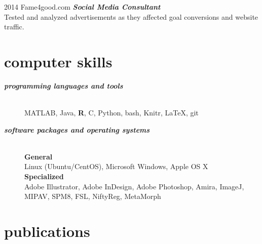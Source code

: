 \documentclass[]{friggeri-cv} %
\begin{document}
\begin{entrylist}
\entry
{\footnotesize{2014}}
{Fame4good.com}
{}
{\textbf{\emph{Social Media Consultant}} \\
Tested and analyzed advertisements as they affected goal conversions and website traffic.}
\end {entrylist}


\section{computer skills}
\begin{description}
   \item[\textbf{\textit{programming languages and tools}}] \hfill \\  
	 MATLAB, Java, \textbf{R}, C, Python, bash, Knitr, \LaTeX, git
   \item[\textbf{\textit{software packages and operating systems}}] \hfill \\
	    \textbf{General} \\
		Linux (Ubuntu/CentOS), Microsoft Windows, Apple OS X \\
	    \textbf{Specialized} \\
	    Adobe Illustrator, Adobe InDesign, Adobe Photoshop, Amira, ImageJ, MIPAV, SPM8, FSL, NiftyReg, MetaMorph 
\end{description}



\section{publications}
\end{document}
